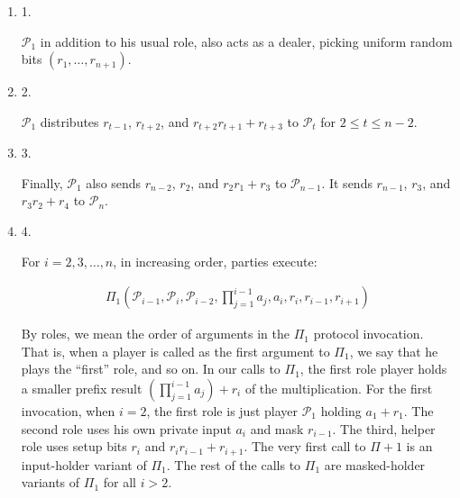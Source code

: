 \documentclass[10pt,a4paper]{article}
\begin{document}
\begin{enumerate}


\item[] 
1. 


$\mathcal{P}_{1}$ in addition to his usual role, also acts as a dealer, picking uniform random bits $(r_{1},\dots,r_{n+1})$.\par





\item[] 
2. 


$\mathcal{P}_{1}$ distributes $r_{t-1}$, $r_{t+2}$, and $r_{t+2}r_{t+1}+r_{t+3}$ to $\mathcal{P}_{t}$ for $2\leq t\leq n-2$.\par





\item[] 
3. 


Finally, $\mathcal{P}_{1}$ also sends $r_{n-2}$, $r_{2}$, and $r_{2}r_{1}+r_{3}$ to $\mathcal{P}_{n-1}$. It sends $r_{n-1}$, $r_{3}$, and $r_{3}r_{2}+r_{4}$ to $\mathcal{P}_{n}$.\par





\item[] 
4. 


For $i=2,3,\dots,n$, in increasing order, parties execute:\par


\[\begin{gathered}
\Pi_{1}\!\left(\mathcal{P}_{i-1},\mathcal{P}_{i},\mathcal{P}_{i-2},\prod_{j=1}^{i-1}a_{j},a_{i},r_{i},r_{i-1},r_{i+1}\right)
\end{gathered}\]


By roles, we mean the order of arguments in the $\Pi_{1}$ protocol invocation. That is, when a player is called as the first argument to $\Pi_{1}$, we say that he plays the “first” role, and so on. In our calls to $\Pi_{1}$, the first role player holds a smaller prefix result $(\prod_{j=1}^{i-1}a_{j})+r_{i}$ of the multiplication. For the first invocation, when $i=2$, the first role is just player $\mathcal{P}_{1}$ holding $a_{1}+r_{1}$. The second role uses his own private input $a_{i}$ and mask $r_{i-1}$. The third, helper role uses setup bits $r_{i}$ and $r_{i}r_{i-1}+r_{i+1}$. The very first call to $\Pi+1$ is an input-holder variant of $\Pi_{1}$. The rest of the calls to $\Pi_{1}$ are masked-holder variants of $\Pi_{1}$ for all $i>2$.\par






\end{enumerate}
\end{document}
